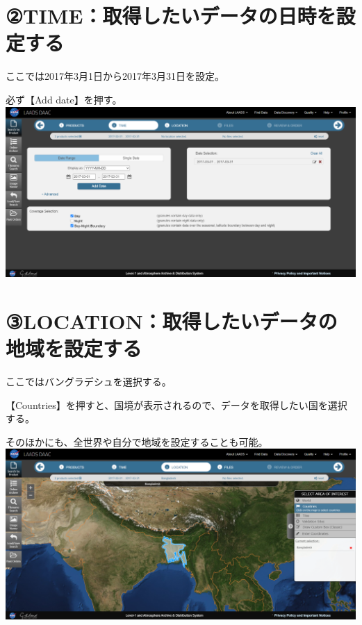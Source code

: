 \documentclass[
]{book}
\begin{document}
\hypertarget{timeux53d6ux5f97ux3057ux305fux3044ux30c7ux30fcux30bfux306eux65e5ux6642ux3092ux8a2dux5b9aux3059ux308b}{%
\section{②TIME：取得したいデータの日時を設定する}\label{timeux53d6ux5f97ux3057ux305fux3044ux30c7ux30fcux30bfux306eux65e5ux6642ux3092ux8a2dux5b9aux3059ux308b}}

ここでは2017年3月1日から2017年3月31日を設定。

必ず【Add date】を押す。
\includegraphics{images/LD-3.png}

\hypertarget{locationux53d6ux5f97ux3057ux305fux3044ux30c7ux30fcux30bfux306eux5730ux57dfux3092ux8a2dux5b9aux3059ux308b}{%
\section{③LOCATION：取得したいデータの地域を設定する}\label{locationux53d6ux5f97ux3057ux305fux3044ux30c7ux30fcux30bfux306eux5730ux57dfux3092ux8a2dux5b9aux3059ux308b}}

ここではバングラデシュを選択する。

【Countries】を押すと、国境が表示されるので、データを取得したい国を選択する。

そのほかにも、全世界や自分で地域を設定することも可能。
\includegraphics{images/LD-4.png}
\end{document}
